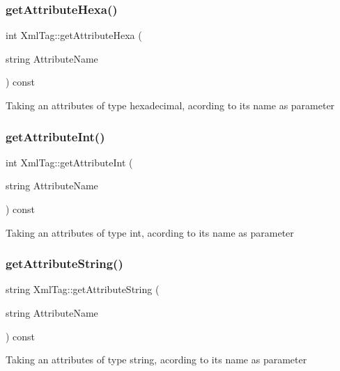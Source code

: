 \subsubsection{\texorpdfstring{get\+Attribute\+Hexa()}{getAttributeHexa()}}
{\footnotesize\ttfamily int Xml\+Tag\+::get\+Attribute\+Hexa (\begin{DoxyParamCaption}\item[{string}]{Attribute\+Name }\end{DoxyParamCaption}) const}

Taking an attribute\textquotesingle{}s of type hexadecimal, acording to its name as parameter \mbox{\label{classXmlTag_aad4c7b8e57cc6d6162338693c5f50721}} 
\subsubsection{\texorpdfstring{get\+Attribute\+Int()}{getAttributeInt()}}
{\footnotesize\ttfamily int Xml\+Tag\+::get\+Attribute\+Int (\begin{DoxyParamCaption}\item[{string}]{Attribute\+Name }\end{DoxyParamCaption}) const}

Taking an attribute\textquotesingle{}s of type int, acording to its name as parameter \mbox{\label{classXmlTag_af17526426288613884f5f028c18d5b73}} 
\subsubsection{\texorpdfstring{get\+Attribute\+String()}{getAttributeString()}}
{\footnotesize\ttfamily string Xml\+Tag\+::get\+Attribute\+String (\begin{DoxyParamCaption}\item[{string}]{Attribute\+Name }\end{DoxyParamCaption}) const}

Taking an attribute\textquotesingle{}s of type string, acording to its name as parameter \mbox{\label{classXmlTag_a0a6f6d258cff2682c36260f448d63ab3}} 
